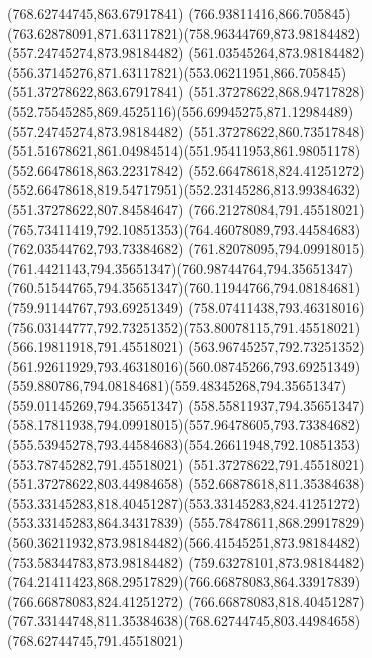 {{	\lineto(768.62744745,863.67917841)
	\curveto(766.93811416,866.705845)(763.62878091,871.63117821)(758.96344769,873.98184482)
	\closepath
	\moveto(557.24745274,873.98184482)
	\lineto(561.03545264,873.98184482)
	\curveto(556.37145276,871.63117821)(553.06211951,866.705845)(551.37278622,863.67917841)
	\lineto(551.37278622,868.94717828)
	\curveto(552.75545285,869.4525116)(556.69945275,871.12984489)(557.24745274,873.98184482)
	\moveto(551.37278622,860.73517848)
	\curveto(551.51678621,861.04984514)(551.95411953,861.98051178)(552.66478618,863.22317842)
	\lineto(552.66478618,824.41251272)
	\curveto(552.66478618,819.54717951)(552.23145286,813.99384632)(551.37278622,807.84584647)
	\closepath
	\moveto(766.21278084,791.45518021)
	\curveto(765.73411419,792.10851353)(764.46078089,793.44584683)(762.03544762,793.73384682)
	\curveto(761.82078095,794.09918015)(761.4421143,794.35651347)(760.98744764,794.35651347)
	\curveto(760.51544765,794.35651347)(760.11944766,794.08184681)(759.91144767,793.69251349)
	\curveto(758.07411438,793.46318016)(756.03144777,792.73251352)(753.80078115,791.45518021)
	\lineto(566.19811918,791.45518021)
	\curveto(563.96745257,792.73251352)(561.92611929,793.46318016)(560.08745266,793.69251349)
	\curveto(559.880786,794.08184681)(559.48345268,794.35651347)(559.01145269,794.35651347)
	\curveto(558.55811937,794.35651347)(558.17811938,794.09918015)(557.96478605,793.73384682)
	\curveto(555.53945278,793.44584683)(554.26611948,792.10851353)(553.78745282,791.45518021)
	\lineto(551.37278622,791.45518021)
	\lineto(551.37278622,803.44984658)
	\curveto(552.66878618,811.35384638)(553.33145283,818.40451287)(553.33145283,824.41251272)
	\lineto(553.33145283,864.34317839)
	\curveto(555.78478611,868.29917829)(560.36211932,873.98184482)(566.41545251,873.98184482)
	\lineto(753.58344783,873.98184482)
	\curveto(759.63278101,873.98184482)(764.21411423,868.29517829)(766.66878083,864.33917839)
	\lineto(766.66878083,824.41251272)
	\curveto(766.66878083,818.40451287)(767.33144748,811.35384638)(768.62744745,803.44984658)
	\lineto(768.62744745,791.45518021)
	\closepath
}
}
{
}
